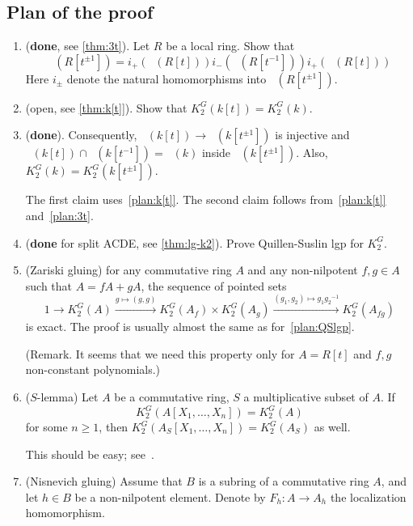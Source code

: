 \documentclass[oneside,12pt]{amsart}
\numberwithin{equation}{section}
\numberwithin{lem}{section}
\theoremstyle{definition}
\theoremstyle{remark}
\DeclareMathOperator{\St}{St^G}
\newcommand{\st}{\scriptstyle}
\begin{document}
\subsection{Plan of the proof}
\begin{enumerate}
\item\label{plan:3t} ({\bf done}, see \cref{thm:3t}). Let $R$ be a local ring. Show that
$$\St(R[t^{\pm 1}])=i_+(\St(R[t]))i_-(\St(R[t^{-1}]))i_+(\St(R[t]))$$
Here $i_\pm$ denote the natural homomorphisms into $\St(R[t^{\pm 1}])$.

\item\label{plan:k[t]} (open, see \cref{thm:k[t]}). Show that $K_2^G(k[t])=K_2^G(k)$.

\item\label{plan:k-intersect} ({\bf done}).
Consequently, $\St(k[t])\to\St(k[t^{\pm 1}])$ is injective and $\St(k[t])\cap\St(k[t^{-1}])=\St(k)$ inside
$\St(k[t^{\pm 1}])$. Also, $K_2^G(k)=K_2^G(k[t^{\pm 1}])$.

The first claim uses~\eqref{plan:k[t]}. The second claim follows from~\eqref{plan:k[t]} and~\eqref{plan:3t}.

\item\label{plan:QSlgp} ({\bf done} for split ACDE, see \cref{thm:lg-k2}). Prove Quillen-Suslin lgp for $K_2^G$.

\item\label{plan:Zglu} (Zariski gluing) for any commutative ring $A$ and any non-nilpotent $f,g\in A$ such that
$A=fA+gA$, the sequence of pointed sets
$$1\longrightarrow K_2^G(A)\xrightarrow{\st g\mapsto (g,g)} K_2^G(A_f)\times K_2^G(A_g)
\xrightarrow{\st (g_1,g_2)\mapsto g_1{g_2}^{-1}} K_2^G(A_{fg})$$
is exact. The proof is usually almost the same as for~\eqref{plan:QSlgp}.

(Remark. It seems that we need this property only for $A=R[t]$ and $f,g$ non-constant polynomials.)

\item\label{plan:S-lemma} ($S$-lemma)
Let $A$ be a commutative ring, $S$ a multiplicative subset of $A$.
If $$K_2^G(A[X_1,\ldots,X_n])=K_2^G(A)$$ for some $n\ge 1$, then
$K_2^G(A_S[X_1,\ldots,X_n])=K_2^G(A_S)$ as well.

This should be easy; see~\cite[Lemma 3.6]{Abe}.

\item\label{plan:Nglu} (Nisnevich gluing) Assume that $B$ is a subring of a commutative ring $A$, and let
$h\in B$ be a non-nilpotent element. Denote by $F_h:A\to A_h$ the localization homomorphism.


\end{enumerate}
\end{document}

